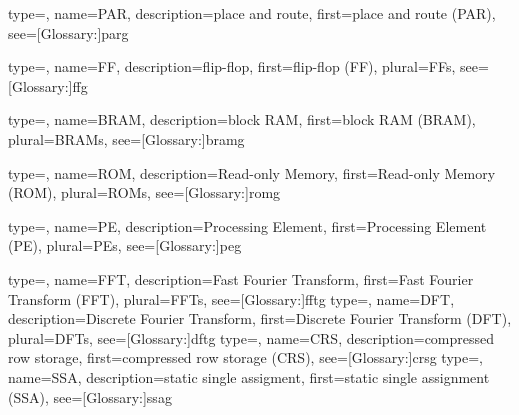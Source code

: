 {
	type=\acronymtype, 
	name={PAR}, 
	description={place and route}, 
	first={place and route (PAR)}, 
	see=[Glossary:]{parg}
}

{
	type=\acronymtype, 
	name={FF}, 
	description={flip-flop}, 
	first={flip-flop (FF)}, 
	plural={FFs},
	see=[Glossary:]{ffg}
}

{
	type=\acronymtype, 
	name={BRAM}, 
	description={block RAM}, 
	first={block RAM (BRAM)}, 
	plural={BRAMs},
	see=[Glossary:]{bramg}
}

{
	type=\acronymtype, 
	name={ROM}, 
	description={Read-only Memory}, 
	first={Read-only Memory (ROM)}, 
	plural={ROMs},
	see=[Glossary:]{romg}
}

{
	type=\acronymtype, 
	name={PE}, 
	description={Processing Element}, 
	first={Processing Element (PE)}, 
	plural={PEs},
	see=[Glossary:]{peg}
}

{
	type=\acronymtype, 
	name={FFT}, 
	description={Fast Fourier Transform}, 
	first={Fast Fourier Transform (FFT)}, 
	plural={FFTs},
	see=[Glossary:]{fftg}
}
{
	type=\acronymtype, 
	name={DFT}, 
	description={Discrete Fourier Transform}, 
	first={Discrete Fourier Transform (DFT)}, 
	plural={DFTs},
	see=[Glossary:]{dftg}
}
{
	type=\acronymtype, 
	name={CRS}, 
	description={compressed row storage}, 
	first={compressed row storage (CRS)}, 
	see=[Glossary:]{crsg}
}
{
	type=\acronymtype, 
	name={SSA}, 
	description={static single assigment}, 
	first={static single assignment (SSA)}, 
	see=[Glossary:]{ssag}
}